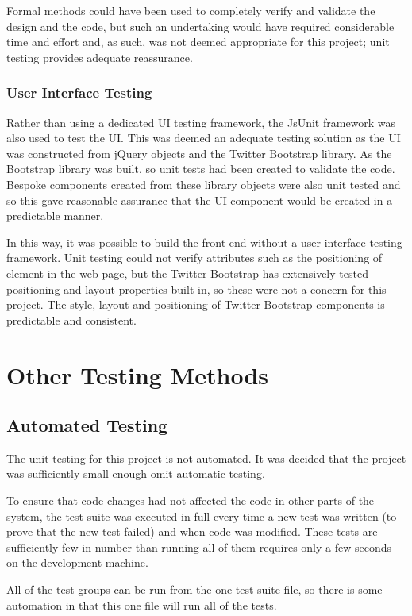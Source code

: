 Formal methods could have been used to completely verify and validate the design and the code, but such an undertaking would have required considerable time and effort and, as such, was not deemed appropriate for this project; unit testing provides adequate reassurance.

\subsubsection{User Interface Testing}
Rather than using a dedicated UI testing framework, the JsUnit framework was also used to test the UI. This was deemed an adequate testing solution as the UI was constructed from jQuery objects and the Twitter Bootstrap library. As the Bootstrap library was built, so unit tests had been created to validate the code. Bespoke components created from these library objects were also unit tested and so this gave reasonable assurance that the UI component would be created in a predictable manner.

In this way, it was possible to build the front-end without a user interface testing framework. Unit testing could not verify attributes such as the positioning of element in the web page, but the Twitter Bootstrap has extensively tested positioning and layout properties built in, so these were not a concern for this project. The style, layout and positioning of Twitter Bootstrap components is predictable and consistent.

\section{Other Testing Methods}

\subsection{Automated Testing}
The unit testing for this project is not automated. It was decided that the project was sufficiently small enough omit automatic testing.

To ensure that code changes had not affected the code in other parts of the system, the test suite was executed in full every time a new test was written (to prove that the new test failed) and when code was modified. These tests are sufficiently few in number than running all of them requires only a few seconds on the development machine.

All of the test groups can be run from the one test suite file, so there is some automation in that this one file will run all of the tests.

